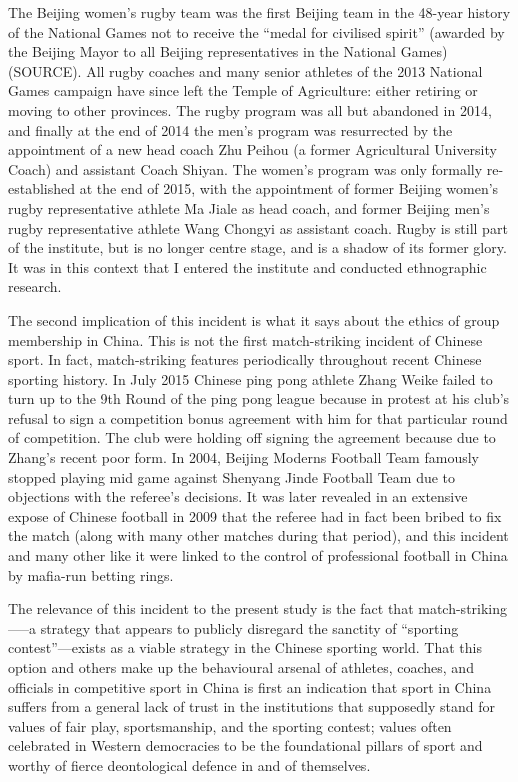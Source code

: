 The Beijing women's rugby team was the first Beijing team in the 48-year history of the National Games not to receive the ``medal for civilised spirit''  (awarded by the Beijing Mayor to all Beijing representatives in the National Games) (SOURCE).  All rugby coaches and many senior athletes of the 2013 National Games campaign have since left the Temple of Agriculture: either retiring or moving to other provinces.  The rugby program was all but abandoned in 2014, and finally at the end of 2014 the men's program was resurrected by the appointment of a new head coach Zhu Peihou (a former Agricultural University Coach) and assistant Coach Shiyan.  The women's program was only formally re-established at the end of 2015, with the appointment of former Beijing women's rugby representative athlete Ma Jiale as head coach, and former Beijing men's rugby representative athlete Wang Chongyi as assistant coach.  Rugby is still part of the institute, but is no longer centre stage, and is a shadow of its former glory.  It was in this context that I entered the institute and conducted ethnographic research.

The second implication of this incident is what it says about the ethics of group membership in China.  This is not the first match-striking incident of Chinese sport. In fact, match-striking features periodically throughout recent Chinese sporting history.  In July 2015 Chinese ping pong athlete Zhang Weike failed to turn up to the 9th Round of the ping pong league because in protest at his club's refusal to sign a competition bonus agreement with him for that particular round of competition. The club were holding off signing the agreement because due to Zhang's recent poor form.  In 2004, Beijing Moderns Football Team famously stopped playing mid game against Shenyang Jinde Football Team due to objections with the referee's decisions. It was later revealed in an extensive expose of Chinese football in 2009 that the referee had in fact been bribed to fix the match (along with many other matches during that period), and this incident and many other like it were linked to the control of professional football in China by mafia-run betting rings.

The relevance of this incident to the present study is the fact that match-striking—--a strategy that appears to publicly disregard the sanctity of ``sporting contest''---exists as a viable strategy in the Chinese sporting world. That this option and others make up the behavioural arsenal of athletes, coaches, and officials in competitive sport in China is first an indication that sport in China suffers from a general lack of trust in the institutions that supposedly stand for values of fair play, sportsmanship, and the sporting contest; values often celebrated in Western democracies to be the foundational pillars of sport and worthy of fierce deontological defence in and of themselves\citep{Morris2004,Gold2002,Yuki2005}.

